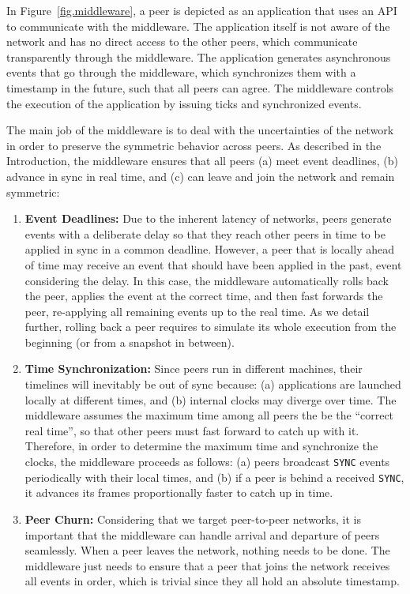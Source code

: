 \documentclass[10pt,journal,compsoc]{IEEEtran}
\newcommand{\code}[1]  {\texttt{\footnotesize{#1}}}
\begin{document}
In Figure~\ref{fig.middleware}, a peer is depicted as an application that uses
an API to communicate with the middleware.
The application itself is not aware of the network and has no direct access to
the other peers, which communicate transparently through the middleware.
The application generates asynchronous events that go through the middleware,
which synchronizes them with a timestamp in the future, such that all peers can
agree.
The middleware controls the execution of the application by issuing ticks and
synchronized events.

The main job of the middleware is to deal with the uncertainties of the
network in order to preserve the symmetric behavior across peers.
As described in the Introduction, the middleware ensures that all peers
    (a) meet event deadlines,
    (b) advance in sync in real time, and
    (c) can leave and join the network and remain symmetric:
%
\begin{enumerate}
\item \textbf{Event Deadlines:}
Due to the inherent latency of networks, peers generate events with a
deliberate delay so that they reach other peers in time to be applied in sync
in a common deadline.
However, a peer that is locally ahead of time may receive an event that should
have been applied in the past, event considering the delay.
In this case, the middleware automatically rolls back the peer, applies the
event at the correct time, and then fast forwards the peer, re-applying all
remaining events up to the real time.
As we detail further, rolling back a peer requires to simulate its whole
execution from the beginning (or from a snapshot in between).
%
\item \textbf{Time Synchronization:}
Since peers run in different machines, their timelines will inevitably be out
of sync because:
    (a) applications are launched locally at different times, and
    (b) internal clocks may diverge over time.
The middleware assumes the maximum time among all peers the be the
``correct real time'', so that other peers must fast forward to catch up with
it.
Therefore, in order to determine the maximum time and synchronize the clocks,
the middleware proceeds as follows:
    (a) peers broadcast \code{SYNC} events periodically with their local
        times, and
    (b) if a peer is behind a received \code{SYNC}, it advances its frames
        proportionally faster to catch up in time.
%
\item \textbf{Peer Churn:}
Considering that we target peer-to-peer networks, it is important that the
middleware can handle arrival and departure of peers seamlessly.
When a peer leaves the network, nothing needs to be done.
The middleware just needs to ensure that a peer that joins the network receives
all events in order, which is trivial since they all hold an absolute
timestamp.
\end{enumerate}
\end{document}
